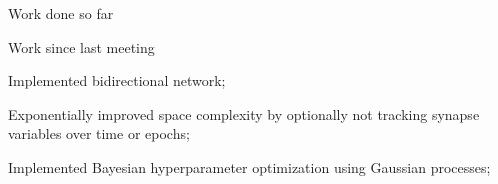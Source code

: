 \documentclass[t]{beamer}
\newcommand{\cmark}{\ding{51}}%
\newcommand{\done}{\rlap{$\square$}{\raisebox{2pt}{\large\hspace{1pt}\cmark}}%
\hspace{-2.5pt}}
\begin{document}
\begin{frame}{Work done so far}
\end{frame}


\begin{frame}{Work since last meeting}
	\begin{todolist}

    \item[\done] Implemented bidirectional network;
    \item[\done] Exponentially improved space complexity by optionally not tracking synapse variables over time or epochs;
    \item[\done] Implemented Bayesian hyperparameter optimization using Gaussian processes;
  \end{todolist}
  
\end{frame}
\end{document}
